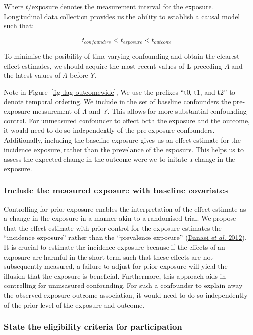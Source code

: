 \documentclass[
  singlecolumn]{article}
\begin{document}
Where \(t/\text{{exposure}}\) denotes the measurement interval for the
exposure. Longitudinal data collection provides us the ability to
establish a causal model such that:

\[t_{confounders} < t_{exposure}< t_{outcome}\]

To minimise the posibility of time-varying confounding and obtain the
clearest effect estimates, we should acquire the most recent values of
\(\mathbf{L}\) preceding \(A\) and the latest values of \(A\) before
\(Y\).

Note in Figure~\ref{fig-dag-outcomewide}, We use the prefixes ``t0, t1,
and t2'' to denote temporal ordering. We include in the set of baseline
confounders the pre-exposure measurement of \emph{A} and \emph{Y}. This
allows for more substantial confounding control. For unmeasured
confounder to affect both the exposure and the outcome, it would need to
do so independently of the pre-exposure confounders. Additionally,
including the baseline exposure gives us an effect estimate for the
incidence exposure, rather than the prevelance of the exposure. This
helps us to assess the expected change in the outcome were we to initate
a change in the exposure.

\hypertarget{include-the-measured-exposure-with-baseline-covariates}{%
\subsubsection{Include the measured exposure with baseline
covariates}\label{include-the-measured-exposure-with-baseline-covariates}}

Controlling for prior exposure enables the interpretation of the effect
estimate as a change in the exposure in a manner akin to a randomised
trial. We propose that the effect estimate with prior control for the
exposure estimates the ``incidence exposure'' rather than the
``prevalence exposure'' (\protect\hyperlink{ref-danaei2012}{Danaei
\emph{et al.} 2012}). It is crucial to estimate the incidence exposure
because if the effects of an exposure are harmful in the short term such
that these effects are not subsequently measured, a failure to adjust
for prior exposure will yield the illusion that the exposure is
beneficial. Furthermore, this approach aids in controlling for
unmeasured confounding. For such a confounder to explain away the
observed exposure-outcome association, it would need to do so
independently of the prior level of the exposure and outcome.

\hypertarget{state-the-eligibility-criteria-for-participation}{%
\subsubsection{State the eligibility criteria for
participation}\label{state-the-eligibility-criteria-for-participation}}
\end{document}
